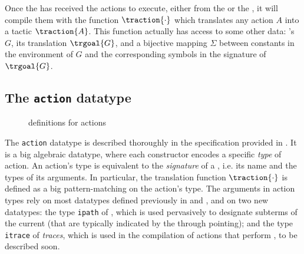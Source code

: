 Once the  has received the actions to execute, either from the
 or the , it will compile them with the function
$\traction{\cdot}$ which translates any action $A$ into a  tactic
$\traction{A}$. This function actually has access to some other data: 's
 $G$, its  translation $\trgoal{G}$, and a bijective mapping
$\Sigma$ between  constants in the environment of $G$ and the
corresponding  symbols in the  signature of
$\trgoal{G}$.

\subsection{The \texttt{action} datatype}

\begin{figure}
  
  \caption{ definitions for actions}
\end{figure}

The \texttt{action} datatype is described thoroughly in the  specification
provided in . It is a big algebraic datatype, where each
constructor encodes a specific \emph{type} of action. An action's type is
equivalent to the \emph{signature} of a , i.e. its name and the types
of its arguments. In particular, the translation function $\traction{\cdot}$ is
defined as a big pattern-matching on the action's type. The arguments in action types
rely on most datatypes defined previously in  and
, and on two new datatypes: the type \texttt{ipath} of
\emph{}, which is used pervasively to designate subterms of the current
 (that are typically indicated by the  through
pointing); and the type \texttt{itrace} of \emph{
traces}, which is used in the compilation of  actions that perform
, to be described soon.

